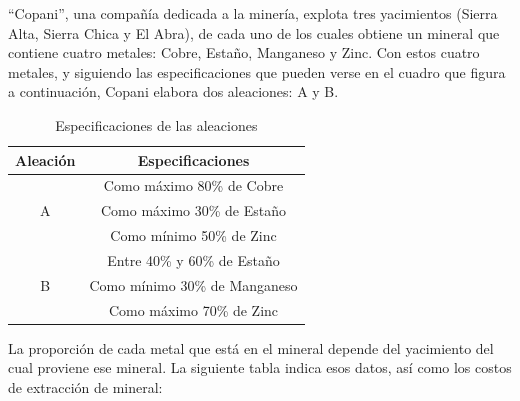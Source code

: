 \documentclass[../main.tex]{subfiles}
\begin{document}
        \begin{exercise} %
            “Copani”, una compañía dedicada a la minería, explota tres yacimientos (Sierra Alta, Sierra Chica y El Abra), de cada uno de los cuales obtiene un mineral que contiene cuatro metales: Cobre, Estaño, Manganeso y Zinc. Con estos cuatro metales, y siguiendo las especificaciones que pueden verse en el cuadro que figura a continuación, Copani elabora dos aleaciones: A y B.

            \begin{table}[h]
                \centering
                \begin{tabular}{|c|c|}
                \hline
                Aleación           & Especificaciones              \\ \hline
                \multirow{3}{*}{A} & Como máximo 80\% de Cobre     \\ \cline{2-2} 
                                   & Como máximo 30\% de Estaño    \\ \cline{2-2} 
                                   & Como mínimo 50\% de Zinc      \\ \hline
                \multirow{3}{*}{B} & Entre 40\% y 60\% de Estaño   \\ \cline{2-2} 
                                   & Como mínimo 30\% de Manganeso \\ \cline{2-2} 
                                   & Como máximo 70\% de Zinc      \\ \hline
                \end{tabular}
                \caption{Especificaciones de las aleaciones}
            \end{table} 
            
            \newpage

            La proporción de cada metal que está en el mineral depende del yacimiento del cual proviene ese mineral. La siguiente tabla indica esos datos, así como los costos de extracción de mineral:


\end{exercise}
\end{document}
